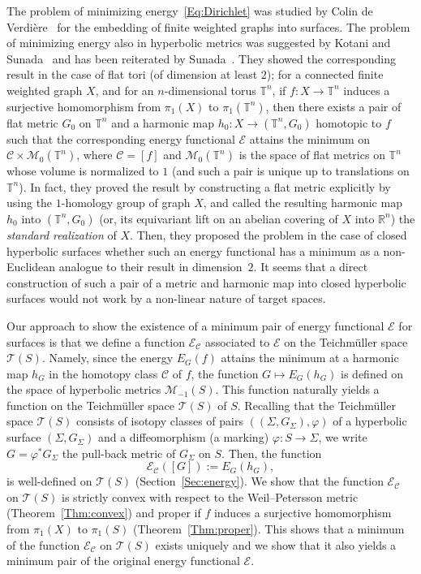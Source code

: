 \documentclass[11pt]{article}
\theoremstyle{definition}
\newcommand{\Mc}{\mathcal{M}}
\numberwithin{equation}{section}
\renewcommand{\SS}{\Sigma}
\newcommand{\f}{\varphi}
\newcommand{\Cc}{\mathcal{C}}
\renewcommand{\Mc}{\mathcal{M}}
\newcommand{\Ec}{\mathcal{E}}
\newcommand{\Tc}{\mathcal{T}}
\newcommand{\R}{\mathbb{R}}
\newcommand{\T}{\mathbb{T}}
\begin{document}
The problem of minimizing energy~\eqref{Eq:Dirichlet} was studied by Colin de Verdière~\cite{ColindeVerdiereComment} for the embedding of finite weighted graphs into surfaces. The problem of minimizing energy also in hyperbolic metrics was suggested by Kotani and Sunada~\cite[p.~7, Section~2]{KotaniSunadaStandard} and has been reiterated by Sunada~\cite[p.~124, Section~7.7]{SunadaTopological}. They showed the corresponding result in the case of flat tori (of dimension at least $2$); for a connected finite weighted graph $X$, and for an $n$-dimensional torus $\T^n$, if $f:X \to \T^n$ induces a surjective homomorphism from $\pi_1(X)$ to $\pi_1(\T^n)$, then there exists a pair of flat metric $G_0$ on $\T^n$ and a harmonic map $h_0: X \to (\T^n, G_0)$ homotopic to $f$ such that the corresponding energy functional $\Ec$ attains the minimum on $\Cc \times \Mc_0(\T^n)$, where $\Cc=[f]$ and $\Mc_0(\T^n)$ is the space of flat metrics on $\T^n$ whose volume is normalized to $1$ (and such a pair is unique up to translations on $\T^n$). In fact, they proved the result by constructing a flat metric explicitly by using the $1$-homology group of graph $X$, and called the resulting harmonic map $h_0$ into $(\T^n, G_0)$ (or, its equivariant lift on an abelian covering of $X$ into $\R^n$) the \emph{standard realization} of $X$. Then, they proposed the problem in the case of closed hyperbolic surfaces whether such an energy functional has a minimum as a non-Euclidean analogue to their result in dimension~$2$. It seems that a direct construction of such a pair of a metric and harmonic map into closed hyperbolic surfaces would not work by a non-linear nature of target spaces.


Our approach to show the existence of a minimum pair of energy functional $\Ec$ for surfaces is that we define a function $\Ec_\Cc$ associated to $\Ec$ on the Teichm\"uller space $\Tc(S)$. Namely, since the energy $E_G(f)$ attains the minimum at a harmonic map $h_G$ in the homotopy class $\Cc$ of $f$, the function $G \mapsto E_G(h_G)$ is defined on the space of hyperbolic metrics $\Mc_{-1}(S)$. This function naturally yields a function on the Teichm\"uller space $\Tc(S)$ of $S$. Recalling that the Teichm\"uller space $\Tc(S)$ consists of isotopy classes of pairs $((\SS, G_{\SS}), \f)$ of a hyperbolic surface $(\SS, G_{\SS})$ and a diffeomorphism (a marking) $\f:S \to \SS$, we write $G=\f^\ast G_\SS$ the pull-back metric of $G_\SS$ on $S$. Then, the function
\[
\Ec_\Cc([G]):=E_{G}(h_G),
\]
is well-defined on $\Tc(S)$ (Section~\ref{Sec:energy}). We show that the function $\Ec_\Cc$ on $\Tc(S)$ is strictly convex with respect to the Weil--Petersson metric (Theorem~\ref{Thm:convex}) and proper if $f$ induces a surjective homomorphism from $\pi_1(X)$ to $\pi_1(S)$ (Theorem~\ref{Thm:proper}). This shows that a minimum of the function $\Ec_\Cc$ on $\Tc(S)$ exists uniquely and we show that it also yields a minimum pair of the original energy functional $\Ec$.
\end{document}
